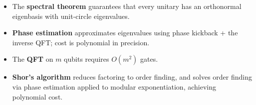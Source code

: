 \documentclass[11pt]{article}
\theoremstyle{definition}
\begin{document}
\begin{itemize}
    \item The \textbf{spectral theorem} guarantees that every unitary has an orthonormal eigenbasis with unit-circle eigenvalues.
    \item \textbf{Phase estimation} approximates eigenvalues using phase kickback + the inverse QFT; cost is polynomial in precision.
    \item The \textbf{QFT} on $m$ qubits requires $O(m^2)$ gates.
    \item \textbf{Shor's algorithm} reduces factoring to order finding, and solves order finding via phase estimation applied to modular exponentiation, achieving polynomial cost.
\end{itemize}
\end{document}
